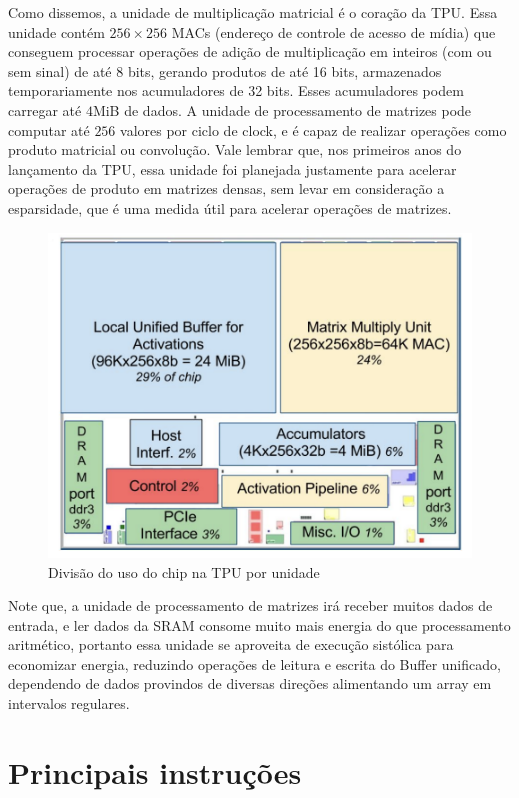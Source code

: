 \documentclass{report}
\begin{document}
\setlength{\parskip}{1em}\hspace{0.5cm} Como dissemos, a unidade de multiplicação matricial é o coração da TPU. Essa unidade contém $256 \times 256$ MACs (endereço de controle de acesso de mídia) que conseguem processar operações de adição de multiplicação em inteiros (com ou sem sinal) de até 8 bits, gerando produtos de até 16 bits, armazenados temporariamente nos acumuladores de 32 bits. Esses acumuladores podem carregar até $4$MiB de dados. A unidade de processamento de matrizes pode computar até $256$ valores por ciclo de clock, e é capaz de realizar operações como produto matricial ou convolução. Vale lembrar que, nos primeiros anos do lançamento da TPU, essa unidade foi planejada justamente para acelerar operações de produto em matrizes densas, sem levar em consideração a esparsidade, que é uma medida útil para acelerar operações de matrizes.

\begin{figure}[h]
	\includegraphics[scale=0.7]{floor-plan}
	\centering
	\caption{Divisão do uso do chip na TPU por unidade}
\end{figure}

Note que, a unidade de processamento de matrizes irá receber muitos dados de entrada, e ler dados da SRAM consome muito mais energia do que processamento aritmético, portanto essa unidade se aproveita de execução sistólica para economizar energia, reduzindo operações de leitura e escrita do Buffer unificado, dependendo de dados provindos de diversas direções alimentando um array em intervalos regulares.

\section{Principais instruções}
\end{document}
